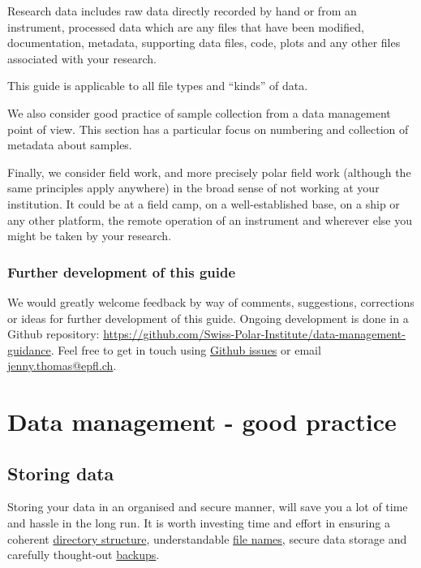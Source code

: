 \documentclass[a4paper,oneside]{report}
\begin{document}
Research data includes raw data directly recorded by hand or from an
instrument, processed data which are any files that have been modified,
documentation, metadata, supporting data files, code, plots and any
other files associated with your research.

This guide is applicable to all file types and ``kinds'' of data.

We also consider good practice of sample collection from a data
management point of view. This section has a particular focus on
numbering and collection of metadata about samples.

Finally, we consider field work, and more precisely polar field work
(although the same principles apply anywhere) in the broad sense of not
working at your institution. It could be at a field camp, on a
well-established base, on a ship or any other platform, the remote
operation of an instrument and wherever else you might be taken by your
research.

\hypertarget{further-development-of-this-guide}{%
\section{Further development of this
guide}\label{further-development-of-this-guide}}

We would greatly welcome feedback by way of comments, suggestions,
corrections or ideas for further development of this guide. Ongoing
development is done in a Github repository:
\url{https://github.com/Swiss-Polar-Institute/data-management-guidance}.
Feel free to get in touch using
\href{https://github.com/Swiss-Polar-Institute/data-management-guidance/issues}{Github
issues} or email \url{jenny.thomas@epfl.ch}.

\hypertarget{data-management---good-practice}{%
\part{Data management - good
practice}\label{data-management---good-practice}}

\hypertarget{storing-data}{%
\chapter{Storing data}\label{storing-data}}

Storing your data in an organised and secure manner, will save you a lot
of time and hassle in the long run. It is worth investing time and
effort in ensuring a coherent
\protect\hyperlink{directory-structure}{directory structure},
understandable \protect\hyperlink{file-naming}{file names}, secure data
storage and carefully thought-out
\protect\hyperlink{data-backup}{backups}.
\end{document}
